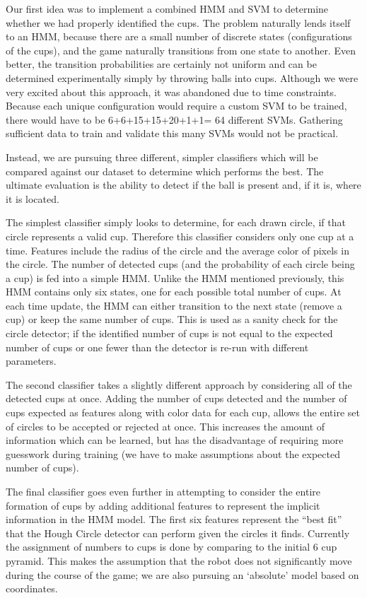 \documentclass[letterpaper, 10 pt, conference]{ieeeconf}  %
\begin{document}
Our first idea was to implement a combined HMM and SVM to determine whether we had properly identified the cups.  The problem naturally lends itself to an HMM, because there are a small number of discrete states (configurations of the cups), and the game naturally transitions from one state to another.  Even better, the transition probabilities are certainly not uniform and can be determined experimentally simply by throwing balls into cups.  Although we were very excited about this approach, it was abandoned due to time constraints.  Because each unique configuration would require a custom SVM to be trained, there would have to be 6+6+15+15+20+1+1= 64 different SVMs.  Gathering sufficient data to train and validate this many SVMs would not be practical.

Instead, we are pursuing three different, simpler classifiers which will be compared against our dataset to determine which performs the best.  The ultimate evaluation is the ability to detect if the ball is present and, if it is, where it is located.

The simplest classifier simply looks to determine, for each drawn circle, if that circle represents a valid cup.  Therefore this classifier considers only one cup at a time.  Features include the radius of the circle and the average color of pixels in the circle.  The number of detected cups (and the probability of each circle being a cup) is fed into a simple HMM.  Unlike the HMM mentioned previously, this HMM contains only six states, one for each possible total number of cups.  At each time update, the HMM can either transition to the next state (remove a cup) or keep the same number of cups.  This is used as a sanity check for the circle detector; if the identified number of cups is not equal to the expected number of cups or one fewer than the detector is re-run with different parameters.

The second classifier takes a slightly different approach by considering all of the detected cups at once. Adding the number of cups detected and the number of cups expected as features along with color data for each cup, allows the entire set of circles to be accepted or rejected at once.  This increases the amount of information which can be learned, but has the disadvantage of requiring more guesswork during training (we have to make assumptions about the expected number of cups).

The final classifier goes even further in attempting to consider the entire formation of cups by adding additional features to represent the implicit information in the HMM model.  The first six features represent the “best fit” that the Hough Circle detector can perform given the circles it finds.  Currently the assignment of numbers to cups is done by comparing to the initial 6 cup pyramid.  This makes the assumption that the robot does not significantly move during the course of the game; we are also pursuing an ‘absolute’ model based on coordinates.
    
\end{document}
